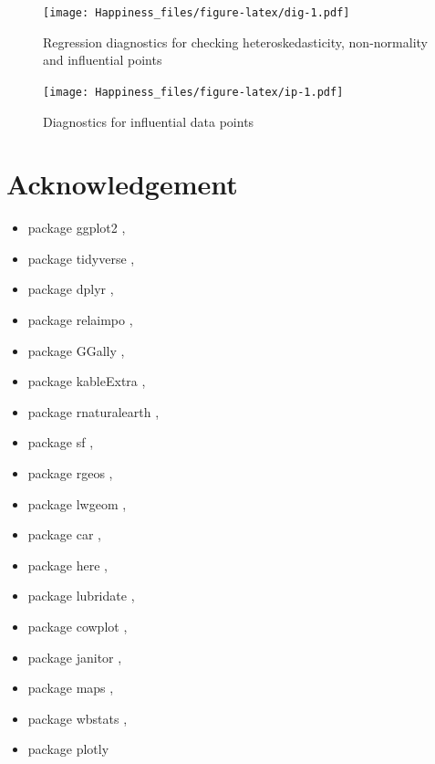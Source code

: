 \documentclass[11pt,a4paper,]{article}
\providecommand{\tightlist}{%
  \setlength{\itemsep}{0pt}\setlength{\parskip}{0pt}}
\begin{document}
\begin{figure}
\centering
\texttt{[image: Happiness\_files/figure-latex/dig-1.pdf]}
\caption{\label{fig:dig}Regression diagnostics for checking heteroskedasticity, non-normality and influential points}
\end{figure}

\begin{figure}
\centering
\texttt{[image: Happiness\_files/figure-latex/ip-1.pdf]}
\caption{\label{fig:ip}Diagnostics for influential data points}
\end{figure}

\clearpage

\hypertarget{acknowledgement}{%
\section{Acknowledgement}\label{acknowledgement}}

\begin{itemize}
\tightlist
\item
  package ggplot2 \autocite{ggplot2},
\item
  package tidyverse \autocite{tidyverse},
\item
  package dplyr \autocite{dplyr},
\item
  package relaimpo \autocite{relaimpo},
\item
  package GGally \autocite{GGally},
\item
  package kableExtra \autocite{kableExtra},
\item
  package rnaturalearth \autocite{rnaturalearth},
\item
  package sf \autocite{sf},
\item
  package rgeos \autocite{rgeos},
\item
  package lwgeom \autocite{lwgeom},
\item
  package car \autocite{car},
\item
  package here \autocite{here},
\item
  package lubridate \autocite{lubridate},
\item
  package cowplot \autocite{cowplot},
\item
  package janitor \autocite{janitor},
\item
  package maps \autocite{maps},
\item
  package wbstats \autocite{wbstats},
\item
  package plotly \autocite{plotly}
\end{itemize}

\clearpage

\printbibliography
\end{document}
